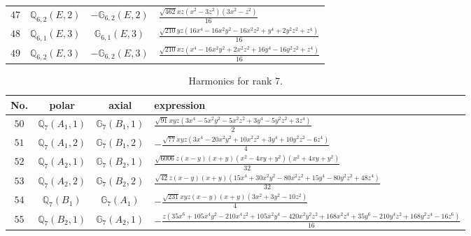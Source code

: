 \documentclass[fleqn,8pt,landscape]{jsarticle}
\begin{document}
\begin{table}[ht!]
\begin{center}
\begin{tabular}{cccl}
$ 47 $ & $ \mathbb{Q}_{6,2}(E,2) $ & $ -\mathbb{G}_{6,2}(E,2) $ & $ \frac{\sqrt{462} x z \left(x^{2} - 3 z^{2}\right) \left(3 x^{2} - z^{2}\right)}{16} $ \\
$ 48 $ & $ \mathbb{Q}_{6,1}(E,3) $ & $ \mathbb{G}_{6,1}(E,3) $ & $ \frac{\sqrt{210} y z \left(16 x^{4} - 16 x^{2} y^{2} - 16 x^{2} z^{2} + y^{4} + 2 y^{2} z^{2} + z^{4}\right)}{16} $ \\
$ 49 $ & $ \mathbb{Q}_{6,2}(E,3) $ & $ -\mathbb{G}_{6,2}(E,3) $ & $ \frac{\sqrt{210} x z \left(x^{4} - 16 x^{2} y^{2} + 2 x^{2} z^{2} + 16 y^{4} - 16 y^{2} z^{2} + z^{4}\right)}{16} $ \\
 \hline \hline
\end{tabular}
\end{center}
\end{table}
\begin{table}[ht!]
\begin{center}
\caption{Harmonics for rank 7.}
\renewcommand{\arraystretch}{1.3}
\begin{tabular}{cccl} \hline \hline
No. & polar & axial & expression \\ \hline
$ 50 $ & $ \mathbb{Q}_{7}(A_{1},1) $ & $ \mathbb{G}_{7}(B_{1},1) $ & $ \frac{\sqrt{91} x y z \left(3 x^{4} - 5 x^{2} y^{2} - 5 x^{2} z^{2} + 3 y^{4} - 5 y^{2} z^{2} + 3 z^{4}\right)}{2} $ \\
$ 51 $ & $ \mathbb{Q}_{7}(A_{1},2) $ & $ \mathbb{G}_{7}(B_{1},2) $ & $ - \frac{\sqrt{77} x y z \left(3 x^{4} - 20 x^{2} y^{2} + 10 x^{2} z^{2} + 3 y^{4} + 10 y^{2} z^{2} - 6 z^{4}\right)}{4} $ \\
$ 52 $ & $ \mathbb{Q}_{7}(A_{2},1) $ & $ \mathbb{G}_{7}(B_{2},1) $ & $ \frac{\sqrt{6006} z \left(x - y\right) \left(x + y\right) \left(x^{2} - 4 x y + y^{2}\right) \left(x^{2} + 4 x y + y^{2}\right)}{32} $ \\
$ 53 $ & $ \mathbb{Q}_{7}(A_{2},2) $ & $ \mathbb{G}_{7}(B_{2},2) $ & $ \frac{\sqrt{42} z \left(x - y\right) \left(x + y\right) \left(15 x^{4} + 30 x^{2} y^{2} - 80 x^{2} z^{2} + 15 y^{4} - 80 y^{2} z^{2} + 48 z^{4}\right)}{32} $ \\
$ 54 $ & $ \mathbb{Q}_{7}(B_{1}) $ & $ \mathbb{G}_{7}(A_{1}) $ & $ - \frac{\sqrt{231} x y z \left(x - y\right) \left(x + y\right) \left(3 x^{2} + 3 y^{2} - 10 z^{2}\right)}{4} $ \\
$ 55 $ & $ \mathbb{Q}_{7}(B_{2},1) $ & $ \mathbb{G}_{7}(A_{2},1) $ & $ - \frac{z \left(35 x^{6} + 105 x^{4} y^{2} - 210 x^{4} z^{2} + 105 x^{2} y^{4} - 420 x^{2} y^{2} z^{2} + 168 x^{2} z^{4} + 35 y^{6} - 210 y^{4} z^{2} + 168 y^{2} z^{4} - 16 z^{6}\right)}{16} $ \\

\end{tabular}
\end{center}
\end{table}
\end{document}
